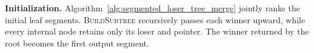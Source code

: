 \noindent\textbf{Initialization.}
Algorithm~\ref{alg:segmented_loser_tree_merge} jointly ranks the initial
leaf segments.  \textsc{BuildSubtree} recursively passes each winner
upward, while every internal node retains only its loser and pointer.
The winner returned by the root becomes the first output segment.

